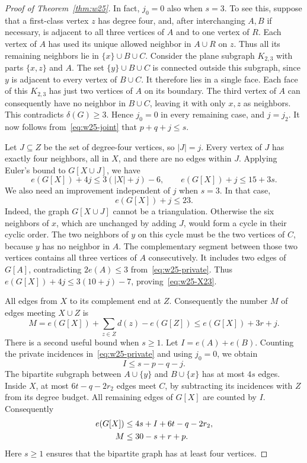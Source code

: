 \documentclass[11pt,a4paper]{article}
\theoremstyle{remark}
\begin{document}
\begin{proof}[Proof of Theorem~\ref{thm:w25}]
In fact, $j_0=0$ also when $s=3$. To see this, suppose that a first-class vertex $z$ has degree four, and, after interchanging $A,B$ if necessary, is adjacent to all three vertices of $A$ and to one vertex of $R$. Each vertex of $A$ has used its unique allowed neighbor in $A\cup R$ on $z$. Thus all its remaining neighbors lie in $\{x\}\cup B\cup C$. Consider the plane subgraph $K_{2,3}$ with parts $\{x,z\}$ and $A$. The set $\{y\}\cup B\cup C$ is connected outside this subgraph, since $y$ is adjacent to every vertex of $B\cup C$. It therefore lies in a single face. Each face of this $K_{2,3}$ has just two vertices of $A$ on its boundary. The third vertex of $A$ can consequently have no neighbor in $B\cup C$, leaving it with only $x,z$ as neighbors. This contradicts $\delta(G)\ge3$. Hence $j_0=0$ in every remaining case, and $j=j_2$. It now follows from~\eqref{eq:w25-joint} that $p+q+j\le s$.

Let $J\subseteq Z$ be the set of degree-four vertices, so $|J|=j$. Every vertex of $J$ has exactly four neighbors, all in $X$, and there are no edges within $J$. Applying Euler's bound to $G[X\cup J]$, we have
\begin{equation}\label{eq:w25-jEuler}
e(G[X])+4j\le3(|X|+j)-6,
\qquad e(G[X])+j\le15+3s.
\end{equation}
We also need an improvement independent of $j$ when $s=3$.
In that case,
\begin{equation}\label{eq:w25-X23}
e(G[X])+j\le23.
\end{equation}
Indeed, the graph $G[X\cup J]$ cannot be a triangulation. Otherwise the six neighbors of $x$, which are unchanged by adding $J$, would form a cycle in their cyclic order. The two neighbors of $y$ on this cycle must be the two vertices of $C$, because $y$ has no neighbor in $A$. The complementary segment between those two vertices contains all three vertices of $A$ consecutively. It includes two edges of $G[A]$, contradicting $2e(A)\le3$ from~\eqref{eq:w25-private}. Thus $e(G[X])+4j\le3(10+j)-7$, proving~\eqref{eq:w25-X23}.

All edges from $X$ to its complement end at $Z$. Consequently the number $M$ of edges meeting $X\cup Z$ is
\begin{equation}\label{eq:w25-deletion}
M=e(G[X])+\sum_{z\in Z}d(z)-e(G[Z])
\le e(G[X])+3r+j.
\end{equation}
There is a second useful bound when $s\ge1$. Let $I=e(A)+e(B)$. Counting the private incidences in~\eqref{eq:w25-private} and using $j_0=0$, we obtain
\[
I\le s-p-q-j.
\]
The bipartite subgraph between $A\cup\{y\}$ and $B\cup\{x\}$ has at most $4s$ edges. Inside $X$, at most $6t-q-2r_2$ edges meet $C$, by subtracting its incidences with $Z$ from its degree budget. All remaining edges of $G[X]$ are counted by $I$. Consequently
\begin{align}
e(G[X])&\le4s+I+6t-q-2r_2,\notag\\
M&\le30-s+r+p.
\label{eq:w25-budget}
\end{align}
Here $s\ge1$ ensures that the bipartite graph has at least four vertices.



\end{proof}
\end{document}
